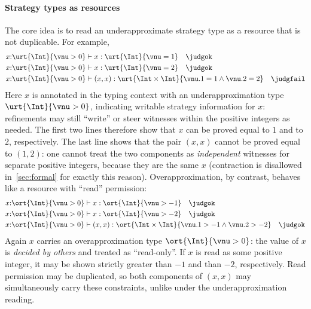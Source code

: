\paragraph{Strategy types as resources} The core idea is to read an underapproximate strategy type as a resource that is not duplicable. For example,
\begin{align*}
  &x{:}\urt{\Int}{\vnu > 0} \vdash x : \urt{\Int}{\vnu = 1} \quad \judgok
  \\&x{:}\urt{\Int}{\vnu > 0} \vdash x : \urt{\Int}{\vnu = 2} \quad \judgok
  \\&x{:}\urt{\Int}{\vnu > 0} \vdash (x, x) : \urt{\Int \times \Int}{\vnu.1 = 1 \land \vnu.2 = 2} \quad \judgfail
\end{align*}
Here $x$ is annotated in the typing context with an underapproximation type $\urt{\Int}{\vnu > 0}$, indicating writable strategy information for $x$: refinements may still ``write'' or steer witnesses within the positive integers as needed. The first two lines therefore show that $x$ can be proved equal to $1$ and to $2$, respectively. The last line shows that the pair $(x, x)$ cannot be proved equal to $(1, 2)$: one cannot treat the two components as \emph{independent} witnesses for separate positive integers, because they are the same $x$ (contraction is disallowed in~\autoref{sec:formal} for exactly this reason). Overapproximation, by contrast, behaves like a resource with ``read'' permission:
\begin{align*}
  &x{:}\ort{\Int}{\vnu > 0} \vdash x : \ort{\Int}{\vnu > -1} \quad \judgok
  \\&x{:}\ort{\Int}{\vnu > 0} \vdash x : \ort{\Int}{\vnu > -2} \quad \judgok
  \\&x{:}\ort{\Int}{\vnu > 0} \vdash (x, x) : \ort{\Int \times \Int}{\vnu.1 > -1 \land \vnu.2 > -2} \quad \judgok
\end{align*}
Again $x$ carries an overapproximation type $\ort{\Int}{\vnu > 0}$: the value of $x$ is \emph{decided by others} and treated as ``read-only''. If $x$ is read as some positive integer, it may be shown strictly greater than $-1$ and than $-2$, respectively. Read permission may be duplicated, so both components of $(x, x)$ may simultaneously carry these constraints, unlike under the underapproximation reading.

